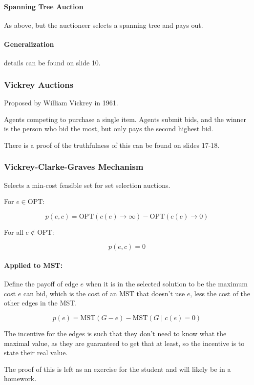 \documentclass{idc_msc}
\begin{document}
\paragraph{Spanning Tree Auction}

As above, but the auctioneer selects a spanning tree and pays out.

\paragraph{Generalization}

details can be found on slide 10.

\subsubsection{Vickrey Auctions}

Proposed by William Vickrey in 1961\cite{vickrey1961counterspeculation}.

Agents competing to purchase a single item.
Agents submit bids, and the winner is the person who bid the most, but only pays the second highest bid.

There is a proof of the truthfulness of this can be found on slides 17-18.

\subsubsection{Vickrey-Clarke-Graves Mechanism}

Selects a min-cost feasible set for set selection auctions.

For \(e \in \text{OPT}\):

\[p(e,c) = \text{OPT}(c(e) \to \infty) - \text{OPT}(c(e) \to 0)\]

For all \(e \notin \text{OPT}\):

\[p(e,c) = 0\]

\paragraph{Applied to MST:}

Define the payoff of edge \(e\) when it is in the selected solution to be the maximum cost \(e\) can bid, which is the cost of an MST that doesn't use \(e\), less the cost of the other edges in the MST.

\[
p(e) = \text{MST}(G-e) - \text{MST}(G \mid c(e) = 0)
\]

The incentive for the edges is such that they don't need to know what the maximal value, as they are guaranteed to get that at least, so the incentive is to state their real value.

The proof of this is left as an exercise for the student and will likely be in a homework.
\end{document}
